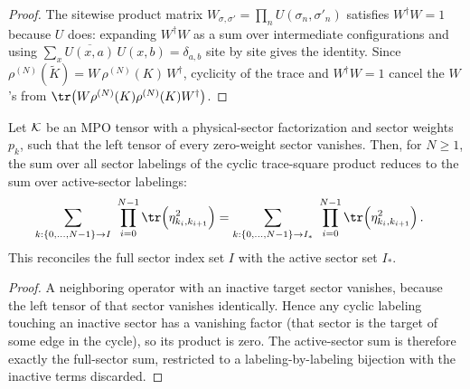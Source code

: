 \begin{proof}
    \leanok
    The sitewise product matrix $W_{\sigma,\sigma'}=\prod_n U(\sigma_n,\sigma'_n)$
    satisfies $W^\dagger W=1$ because $U$ does: expanding $W^\dagger W$ as a sum
    over intermediate configurations and using $\sum_x\overline{U(x,a)}\,U(x,b)
        =\delta_{a,b}$ site by site gives the identity. Since
    $\rho^{(N)}(\widetilde K)=W\,\rho^{(N)}(K)\,W^\dagger$, cyclicity of the
    trace and $W^\dagger W=1$ cancel the $W$'s from
    $\tr\!\left(W\rho^{(N)}(K)\rho^{(N)}(K)W^\dagger\right)$.
\end{proof}

\begin{lemma}
    \label{lem:mpdo_sum_prod_traceSq_active}
    \leanok
    Let ${\cal K}$ be an MPO tensor with a physical-sector factorization
    and sector weights $p_k$, such that the left tensor of every
    zero-weight sector vanishes. Then, for $N\geq1$, the sum over all
    sector labelings of the cyclic trace-square product reduces to the
    sum over active-sector labelings:
    \begin{align}
        \sum_{k:\{0,\ldots,N-1\}\to I}\ \prod_{i=0}^{N-1}
        \tr\!\left(\eta_{k_i,k_{i+1}}^2\right)
         & =\sum_{k:\{0,\ldots,N-1\}\to I_*}\ \prod_{i=0}^{N-1}
        \tr\!\left(\eta_{k_i,k_{i+1}}^2\right).
        \notag
    \end{align}
    This reconciles the full sector index set $I$ with the active sector set
    $I_*$.
\end{lemma}

\begin{proof}
    \leanok
    A neighboring operator with an inactive target sector vanishes,
    because the left tensor of that sector vanishes identically. Hence any
    cyclic labeling touching an inactive sector has a vanishing factor
    (that sector is the target of some edge in the cycle), so its product
    is zero. The active-sector sum is therefore exactly the full-sector
    sum, restricted to a labeling-by-labeling bijection with the inactive
    terms discarded.
\end{proof}

